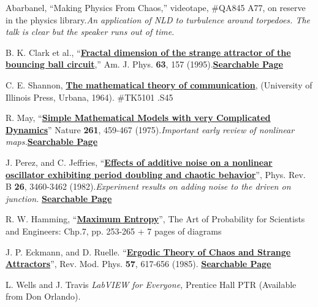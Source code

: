 \documentclass{../lab}
\begin{document}
\begin{thebibliography}{}
     Abarbanel, ``Making Physics From Chaos,'' videotape, \#QA845 A77, on reserve in the physics library.\emph{An application of NLD to turbulence around torpedoes. The talk is clear but the speaker runs out of time.}

     B. K. Clark et al., ``\href{http://ajp.aapt.org/resource/1/ajpias/v63/i2/p157\_s1}{\textbf{Fractal dimension of the strange attractor of the bouncing ball circuit}},'' Am. J. Phys. \textbf{63}, 157 (1995).\href{http://physics111.lib.berkeley.edu/Physics111/Reprints/NLD/15-Fractal\_Dimension.pdf}{\textbf{Searchable Page}}

     C. E. Shannon, \href{http://experimentationlab.berkeley.edu/sites/default/files/mathematicaltheorycommunication.pdf}{\textbf{The mathematical theory of communication}}, (University of Illinois Press, Urbana, 1964). \#TK5101 .S45

     R. May, ``\href{http://www.nature.com/nature/journal/v261/n5560/abs/261459a0.html}{\textbf{Simple Mathematical Models with very Complicated Dynamics}}'' Nature \textbf{261}, 459-467 (1975).\emph{Important early review of nonlinear maps.}\href{http://physics111.lib.berkeley.edu/Physics111/Reprints/NLD/04-Simple\_Mathematical\_Models.pdf}{\textbf{Searchable Page}}

     J. Perez, and C. Jeffries, ``\href{http://prb.aps.org/abstract/PRB/v26/i6/p3460\_1}{\textbf{Effects of additive noise on a nonlinear oscillator exhibiting period doubling and chaotic behavior}}'', Phys. Rev. B \textbf{26}, 3460-3462 (1982).\emph{Experiment results on adding noise to the driven on junction.} \href{http://physics111.lib.berkeley.edu/Physics111/Reprints/NLD/10-Effects\_of\_Additive\_Noise.pdf}{\textbf{Searchable Page}}

     R. W. Hamming, ``\href{http://physics111.lib.berkeley.edu/Physics111/Reprints/NLD/12-Maximum\_Entropy.pdf}{\textbf{Maximum Entropy}}'', The Art of Probability for Scientists and Engineers: Chp.7, pp. 253-265 + 7 pages of diagrams

     J. P. Eckmann, and D. Ruelle. ``\href{http://rmp.aps.org/abstract/RMP/v57/i3/p617\_1}{\textbf{Ergodic Theory of Chaos and Strange Attractors}}'', Rev. Mod. Phys. \textbf{57}, 617-656 (1985). \href{http://physics111.lib.berkeley.edu/Physics111/Reprints/NLD/17-Ergodic\_Theory.pdf}{\textbf{Searchable Page}}

     L. Wells and J. Travis \emph{LabVIEW for Everyone, }Prentice Hall PTR (Available from Don Orlando).
\end{thebibliography}
\endgroup
\end{document}
